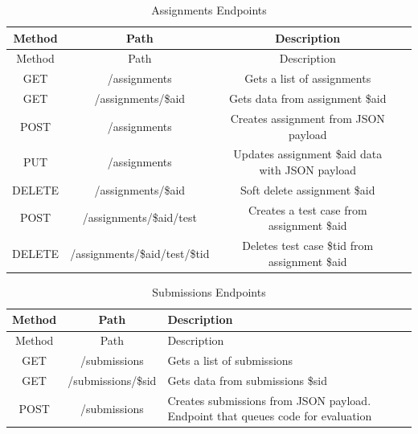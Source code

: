 \setlength{\extrarowheight}{1.5pt}
    \begin{longtable}{|c|c|c|c|}
 \caption{Assignments Endpoints\label{tab:addlabel}} \\
     \hline
    
    \centering  Method & Path & Description \\
    \hline \hline \endfirsthead
    
         \hline

    \centering  Method & Path & Description \\
    \hline \hline \endhead
    
    \endfoot 
    GET   & /assignments & {Gets a list of assignments} \\ \hline
    GET   & /assignments/\$aid & {Gets data from assignment \$aid} \\ \hline
    POST  & /assignments & {Creates assignment from JSON payload} \\ \hline
    PUT   & /assignments & {Updates assignment \$aid data with JSON payload} \\ \hline
    DELETE & /assignments/\$aid & {Soft delete assignment \$aid} \\ \hline
    POST  & /assignments/\$aid/test & {Creates a test case from assignment \$aid} \\ \hline
    DELETE & /assignments/\$aid/test/\$tid & {Deletes test case \$tid from assignment \$aid} \\ \hline
\end{longtable}

\setlength{\extrarowheight}{1.5pt}
    \begin{longtable}{|c|c|m{10cm}|}
 \caption{Submissions Endpoints\label{tab:addlabel}} \\
     \hline
    
    \centering  Method & Path & Description \\
    \hline \hline \endfirsthead
    
         \hline

    \centering  Method & Path & Description \\
    \hline \hline \endhead
    
    \endfoot 
    GET   & /submissions & {Gets a list of submissions} \\ \hline
    GET   & /submissions/\$sid & {Gets data from submissions \$sid} \\ \hline
    POST  & /submissions & {Creates submissions from JSON payload. Endpoint that queues code for evaluation} \\ \hline
\end{longtable}


